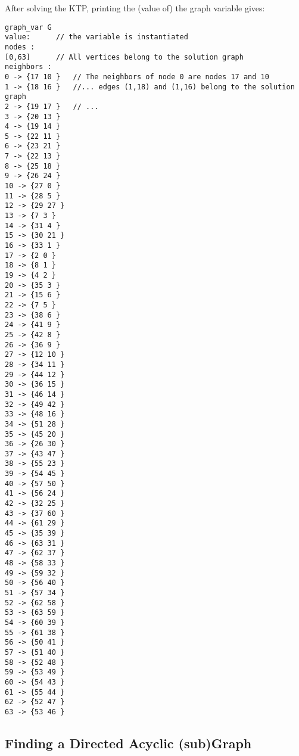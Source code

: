 \documentclass{article}
\begin{document}
After solving the KTP, printing the (value of) the graph variable gives:
\begin{lstlisting}
graph_var G
value: 		// the variable is instantiated
nodes : 
[0,63]		// All vertices belong to the solution graph
neighbors : 
0 -> {17 10 }	// The neighbors of node 0 are nodes 17 and 10
1 -> {18 16 }	//... edges (1,18) and (1,16) belong to the solution graph
2 -> {19 17 }	// ...
3 -> {20 13 }
4 -> {19 14 }
5 -> {22 11 }
6 -> {23 21 }
7 -> {22 13 }
8 -> {25 18 }
9 -> {26 24 }
10 -> {27 0 }
11 -> {28 5 }
12 -> {29 27 }
13 -> {7 3 }
14 -> {31 4 }
15 -> {30 21 }
16 -> {33 1 }
17 -> {2 0 }
18 -> {8 1 }
19 -> {4 2 }
20 -> {35 3 }
21 -> {15 6 }
22 -> {7 5 }
23 -> {38 6 }
24 -> {41 9 }
25 -> {42 8 }
26 -> {36 9 }
27 -> {12 10 }
28 -> {34 11 }
29 -> {44 12 }
30 -> {36 15 }
31 -> {46 14 }
32 -> {49 42 }
33 -> {48 16 }
34 -> {51 28 }
35 -> {45 20 }
36 -> {26 30 }
37 -> {43 47 }
38 -> {55 23 }
39 -> {54 45 }
40 -> {57 50 }
41 -> {56 24 }
42 -> {32 25 }
43 -> {37 60 }
44 -> {61 29 }
45 -> {35 39 }
46 -> {63 31 }
47 -> {62 37 }
48 -> {58 33 }
49 -> {59 32 }
50 -> {56 40 }
51 -> {57 34 }
52 -> {62 58 }
53 -> {63 59 }
54 -> {60 39 }
55 -> {61 38 }
56 -> {50 41 }
57 -> {51 40 }
58 -> {52 48 }
59 -> {53 49 }
60 -> {54 43 }
61 -> {55 44 }
62 -> {52 47 }
63 -> {53 46 }
\end{lstlisting}

\subsection{Finding a Directed Acyclic (sub)Graph}
\end{document}
